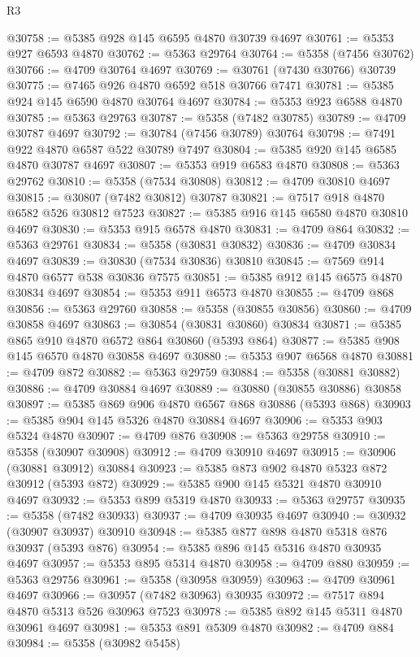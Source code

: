 \begin{lexlean}{R3}
\begin{coremodule}
@30758 := @5385 @928 @145 @6595 @4870 @30739 @4697
@30761 := @5353 @927 @6593 @4870
@30762 := @5363 @29764
@30764 := @5358 (@7456 @30762)
@30766 := @4709 @30764 @4697
@30769 := @30761 (@7430 @30766) @30739
@30775 := @7465 @926 @4870 @6592 @518 @30766 @7471
@30781 := @5385 @924 @145 @6590 @4870 @30764 @4697
@30784 := @5353 @923 @6588 @4870
@30785 := @5363 @29763
@30787 := @5358 (@7482 @30785)
@30789 := @4709 @30787 @4697
@30792 := @30784 (@7456 @30789) @30764
@30798 := @7491 @922 @4870 @6587 @522 @30789 @7497
@30804 := @5385 @920 @145 @6585 @4870 @30787 @4697
@30807 := @5353 @919 @6583 @4870
@30808 := @5363 @29762
@30810 := @5358 (@7534 @30808)
@30812 := @4709 @30810 @4697
@30815 := @30807 (@7482 @30812) @30787
@30821 := @7517 @918 @4870 @6582 @526 @30812 @7523
@30827 := @5385 @916 @145 @6580 @4870 @30810 @4697
@30830 := @5353 @915 @6578 @4870
@30831 := @4709 @864
@30832 := @5363 @29761
@30834 := @5358 (@30831 @30832)
@30836 := @4709 @30834 @4697
@30839 := @30830 (@7534 @30836) @30810
@30845 := @7569 @914 @4870 @6577 @538 @30836 @7575
@30851 := @5385 @912 @145 @6575 @4870 @30834 @4697
@30854 := @5353 @911 @6573 @4870
@30855 := @4709 @868
@30856 := @5363 @29760
@30858 := @5358 (@30855 @30856)
@30860 := @4709 @30858 @4697
@30863 := @30854 (@30831 @30860) @30834
@30871 := @5385 @865 @910 @4870 @6572 @864 @30860 (@5393 @864)
@30877 := @5385 @908 @145 @6570 @4870 @30858 @4697
@30880 := @5353 @907 @6568 @4870
@30881 := @4709 @872
@30882 := @5363 @29759
@30884 := @5358 (@30881 @30882)
@30886 := @4709 @30884 @4697
@30889 := @30880 (@30855 @30886) @30858
@30897 := @5385 @869 @906 @4870 @6567 @868 @30886 (@5393 @868)
@30903 := @5385 @904 @145 @5326 @4870 @30884 @4697
@30906 := @5353 @903 @5324 @4870
@30907 := @4709 @876
@30908 := @5363 @29758
@30910 := @5358 (@30907 @30908)
@30912 := @4709 @30910 @4697
@30915 := @30906 (@30881 @30912) @30884
@30923 := @5385 @873 @902 @4870 @5323 @872 @30912 (@5393 @872)
@30929 := @5385 @900 @145 @5321 @4870 @30910 @4697
@30932 := @5353 @899 @5319 @4870
@30933 := @5363 @29757
@30935 := @5358 (@7482 @30933)
@30937 := @4709 @30935 @4697
@30940 := @30932 (@30907 @30937) @30910
@30948 := @5385 @877 @898 @4870 @5318 @876 @30937 (@5393 @876)
@30954 := @5385 @896 @145 @5316 @4870 @30935 @4697
@30957 := @5353 @895 @5314 @4870
@30958 := @4709 @880
@30959 := @5363 @29756
@30961 := @5358 (@30958 @30959)
@30963 := @4709 @30961 @4697
@30966 := @30957 (@7482 @30963) @30935
@30972 := @7517 @894 @4870 @5313 @526 @30963 @7523
@30978 := @5385 @892 @145 @5311 @4870 @30961 @4697
@30981 := @5353 @891 @5309 @4870
@30982 := @4709 @884
@30984 := @5358 (@30982 @5458)

\end{coremodule}
\end{lexlean}
